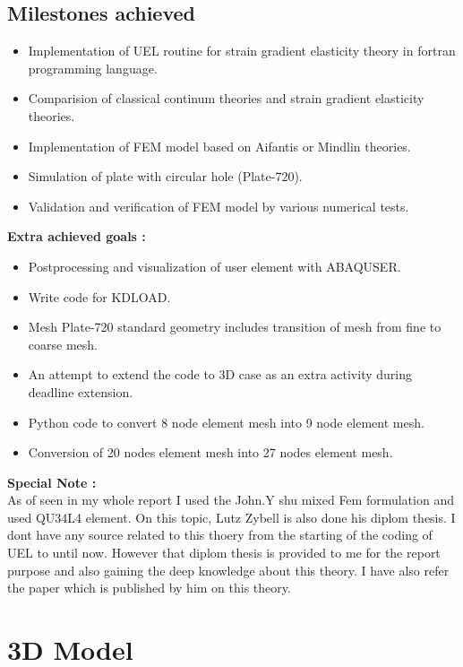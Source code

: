 \documentclass[12pt]{article}
\begin{document}
\subsection{Milestones achieved}
\begin{itemize}
	\item Implementation of UEL routine for strain gradient elasticity theory in fortran programming language.
    \item Comparision of classical continum theories and strain gradient elasticity theories.
    \item Implementation of FEM model based on Aifantis or Mindlin theories.
    \item Simulation of plate with circular hole (Plate-720).
    \item Validation and verification of FEM model by various numerical tests.
\end{itemize}
\textbf{Extra achieved goals :}
\begin{itemize}
	\item Postprocessing and visualization of user element with ABAQUSER.
	\item Write code for KDLOAD.
	\item Mesh Plate-720 standard geometry includes transition of mesh from fine to coarse mesh.
	\item An attempt to extend the code to 3D case as an extra activity during deadline extension.
	\item Python code to convert 8 node element mesh into 9 node element mesh.
	\item Conversion of 20 nodes element mesh into 27 nodes element mesh.
\end{itemize}
\vspace{1cm}
\textbf{Special Note :} \\
As of seen in my whole report I used the John.Y shu mixed Fem formulation and used QU34L4 element. On this topic, Lutz Zybell is also done his diplom thesis. I dont have any source related to this thoery from the starting of the coding of UEL to until now. However that diplom thesis is provided to me for the report purpose and also gaining the deep knowledge about this theory. I have also refer the paper which is published by him on this theory.

\newpage

\section{3D Model}
\end{document}
